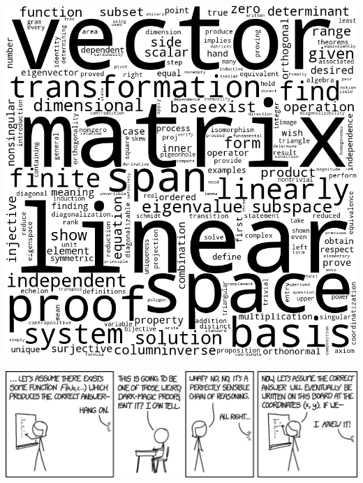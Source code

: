 \documentclass[oneside]{book}
\begin{document}
    

\pagebreak

\chapter*{}

\vspace*{\fill}
\begin{center}
    \includegraphics[scale=0.8]{Graphics/wordcloudlinearalgebra.png}
\end{center}
\vspace*{\fill}

\pagebreak

\appendix
\appendixpage
\noappendicestocpagenum
\addappheadtotoc
\begin{savequote}
    \includegraphics[scale=0.5]{Graphics/proofxkcd.png}
\end{savequote}
\end{document}
